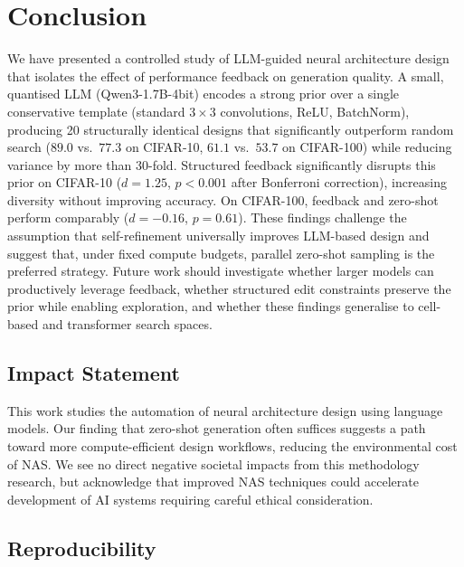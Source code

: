 \documentclass[10pt]{article}
\begin{document}
\section{Conclusion}
\label{sec:conclusion}

We have presented a controlled study of LLM-guided neural architecture design
that isolates the effect of performance feedback on generation quality.  A
small, quantised LLM (Qwen3-1.7B-4bit) encodes a strong prior over a single
conservative template (standard $3{\times}3$ convolutions, ReLU, BatchNorm),
producing 20 structurally identical designs that significantly outperform random
search ($89.0$ vs.\ $77.3$ on CIFAR-10, $61.1$ vs.\ $53.7$ on CIFAR-100)
while reducing variance by more than 30-fold.  Structured feedback significantly
disrupts this prior on CIFAR-10 ($d{=}1.25$, $p{<}0.001$ after Bonferroni
correction), increasing diversity without improving accuracy.  On CIFAR-100,
feedback and zero-shot perform comparably ($d{=}{-}0.16$, $p{=}0.61$).  These
findings challenge the assumption that self-refinement universally improves
LLM-based design and suggest that, under fixed compute budgets, parallel
zero-shot sampling is the preferred strategy.  Future work should investigate
whether larger models can productively leverage feedback, whether structured
edit constraints preserve the prior while enabling exploration, and whether
these findings generalise to cell-based and transformer search spaces.

\subsection*{Impact Statement}

This work studies the automation of neural architecture design using language
models.  Our finding that zero-shot generation often suffices suggests a path
toward more compute-efficient design workflows, reducing the environmental cost
of NAS.  We see no direct negative societal impacts from this methodology
research, but acknowledge that improved NAS techniques could accelerate
development of AI systems requiring careful ethical consideration.

\subsection*{Reproducibility}
\end{document}
